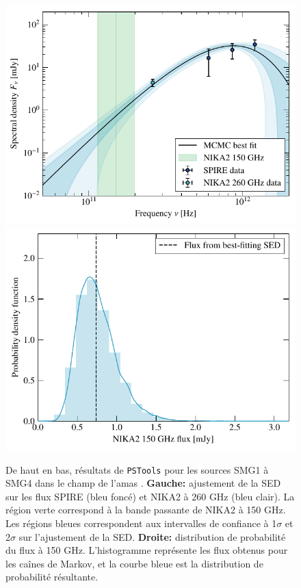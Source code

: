 \begin{figure}[p]
    \includegraphics[height=0.23\textheight]{Figures/Chap_actj0215/PSPlots/4_SED_no2mm.pdf} \hspace{20pt}
    \includegraphics[height=0.23\textheight]{Figures/Chap_actj0215/PSPlots/4_2mm_flux_dist.pdf}
    \caption{
        De haut en bas, résultats de \texttt{PSTools} pour les sources SMG1 à SMG4 dans le champ de l'amas \act.
        \textbf{Gauche:} ajustement de la SED sur les flux SPIRE (bleu foncé) et NIKA2 à 260 GHz (bleu clair).
        La région verte correspond à la bande passante de NIKA2 à 150 GHz.
        Les régions bleues correspondent aux intervalles de confiance à 1$\sigma$ et 2$\sigma$ sur l'ajustement de la SED.
        \textbf{Droite:} distribution de probabilité du flux à 150 GHz.
        L'histogramme représente les flux obtenus pour les caînes de Markov, et la courbe bleue est la distribution de probabilité résultante.
    }
    \label{fig:act:sed}
\end{figure}


